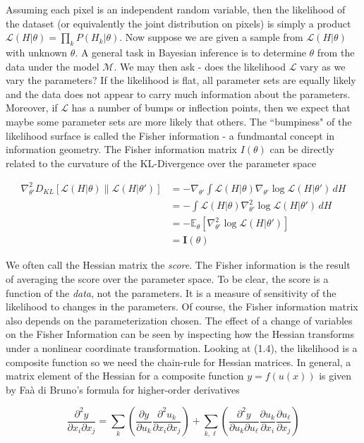 \documentclass{ucetd}
\begin{document}
Assuming each pixel is an independent random variable, then the likelihood of the dataset (or equivalently the joint distribution on pixels) is simply a product $\mathcal{L}(H|\theta) = \prod_{k}P(H_{k}|\theta)$. Now suppose we are given a sample from $\mathcal{L}(H|\theta)$ with unknown $\theta$. A general task in Bayesian inference is to determine $\theta$ from the data under the model $\mathcal{M}$. We may then ask - does the likelihood $\mathcal{L}$ vary as we vary the parameters? If the likelihood is flat, all parameter sets are equally likely and the data does not appear to carry much information about the parameters. Moreover, if $\mathcal{L}$ has a number of bumps or inflection points, then we expect that maybe some parameter sets are more likely that others. The ``bumpiness" of the likelihood surface is called the Fisher information - a fundmantal concept in information geometry. The Fisher information matrix $I(\theta)$ can be directly related to the curvature of the KL-Divergence over the parameter space

\begin{align*}
\nabla^2_{\theta'} D_{KL}[\mathcal{L}(H|\theta) \parallel \mathcal{L}(H|\theta')] 
&= - \nabla_{\theta'} \int \mathcal{L}(H|\theta) \nabla_{\theta'}  \log \mathcal{L}(H|\theta') \, dH \\ 
&= - \int \mathcal{L}(H|\theta) \nabla^2_{\theta'}  \log \mathcal{L}(H|\theta') \, dH \\
&= - \mathbb{E}_{\theta}[\nabla^2_{\theta'} \log \mathcal{L}(H|\theta')] \\
&= \mathbf{I}(\theta)
\end{align*}


We often call the Hessian matrix the \emph{score}. The Fisher information is the result of averaging the score over the parameter space. To be clear, the score is a function of the \emph{data}, not the parameters. It is a measure of sensitivity of the likelihood to changes in the parameters. Of course, the Fisher information matrix also depends on the parameterization chosen. The effect of a change of variables on the Fisher Information can be seen by inspecting how the Hessian transforms under a nonlinear coordinate transformation. Looking at (1.4), the likelihood is a composite function so we need the chain-rule for Hessian matrices. In general, a matrix element of the Hessian for a composite function $y = f(u(x))$ is given by Faà di Bruno's formula for higher-order derivatives 

\begin{equation}
\frac{\partial^2 y}{\partial x_i \partial x_j} = \sum_k \left(\frac{\partial y}{\partial u_k}\frac{\partial^2 u_k}{\partial x_i \partial x_j}\right) + \sum_{k, \ell} \left(\frac{\partial^2 y}{\partial u_k \partial u_\ell}\frac{\partial u_k}{\partial x_i}\frac{\partial u_\ell}{\partial x_j}\right)
\end{equation}
\end{document}
